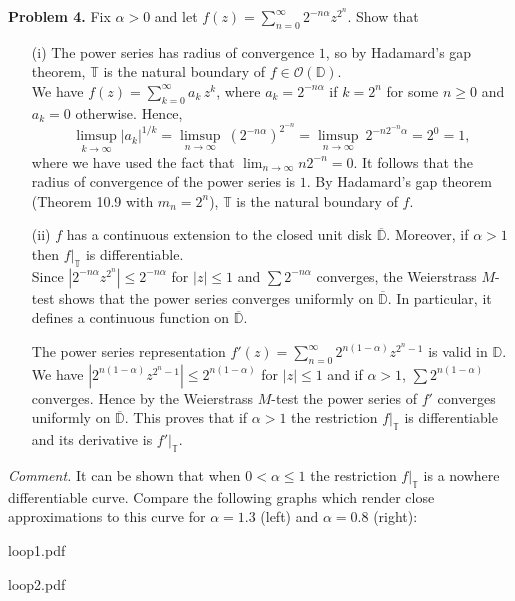 \documentclass[12pt]{amsart}
\newcommand{\ov}{\overline}
\newcommand{\OO}{{\mathcal O}}
\newcommand{\TT}{{\mathbb T}}
\newcommand{\DD}{{\mathbb D}}
\newcommand{\vs}{\vspace{2mm}}
\begin{document}
\noindent
{\bf Problem 4.} Fix $\alpha>0$ and let $f(z)=\sum_{n=0}^{\infty} 2^{-n\alpha} z^{2^n}$. Show that \vs
\begin{enumerate}[leftmargin=*]
\item[(i)]
The power series has radius of convergence $1$, so by Hadamard's gap theorem, $\TT$ is the natural boundary of $f \in \OO(\DD)$. \vs \\
We have $f(z)=\sum_{k=0}^{\infty} a_k \, z^k$, where $a_k=2^{-n\alpha}$ if $k=2^n$ for some $n \geq 0$ and $a_k=0$ otherwise. Hence, 
$$
\limsup_{k \to \infty} |a_k|^{1/k} = \limsup_{n \to \infty} \ (2^{-n\alpha})^{2^{-n}} = \limsup_{n \to \infty} \ 2^{-n2^{-n} \alpha} = 2^0 =1,
$$
where we have used the fact that $\lim_{n \to \infty} n2^{-n}=0$. It follows that the radius of convergence of the power series is $1$. By Hadamard's gap theorem (Theorem 10.9 with $m_n=2^n$), $\TT$ is the natural boundary of $f$. \vs  

\item[(ii)] 
$f$ has a continuous extension to the closed unit disk $\ov{\DD}$. Moreover, if $\alpha>1$ then $f|_\TT$ is differentiable. \vs \\
Since $|2^{-n\alpha} z^{2^n}| \leq 2^{-n\alpha}$ for $|z| \leq 1$ and $\sum 2^{-n\alpha}$ converges, the Weierstrass $M$-test shows that the power series converges uniformly on $\ov{\DD}$. In particular, it defines a continuous function on $\ov{\DD}$. \vs

The power series representation $f'(z)=\sum_{n=0}^{\infty} 2^{n(1-\alpha)} z^{2^n-1}$ is valid in $\DD$. We have $|2^{n(1-\alpha)} z^{2^n-1}| \leq 2^{n(1-\alpha)}$ for $|z| \leq 1$ and if $\alpha>1$, $\sum 2^{n(1-\alpha)}$ converges. Hence by the Weierstrass $M$-test the power series of $f'$ converges uniformly on $\ov{\DD}$. This proves that if $\alpha>1$ the restriction $f|_\TT$ is differentiable and its derivative is $f'|_\TT$.  
\end{enumerate}

\vs  

\noindent
{\it Comment.} It can be shown that when $0<\alpha\leq 1$ the restriction $f|_\TT$ is a nowhere differentiable curve. Compare the following graphs which render close approximations to this curve for $\alpha=1.3$ (left) and $\alpha=0.8$ (right): \vs

\begin{minipage}{0.45\textwidth}
 	\begin{overpic}[height=6cm]{loop1.pdf}
	\end{overpic}
\end{minipage}
\hfill
\begin{minipage}{0.45\textwidth}
 	\begin{overpic}[height=6cm]{loop2.pdf}
	\end{overpic}
\end{minipage}  
\end{document}
